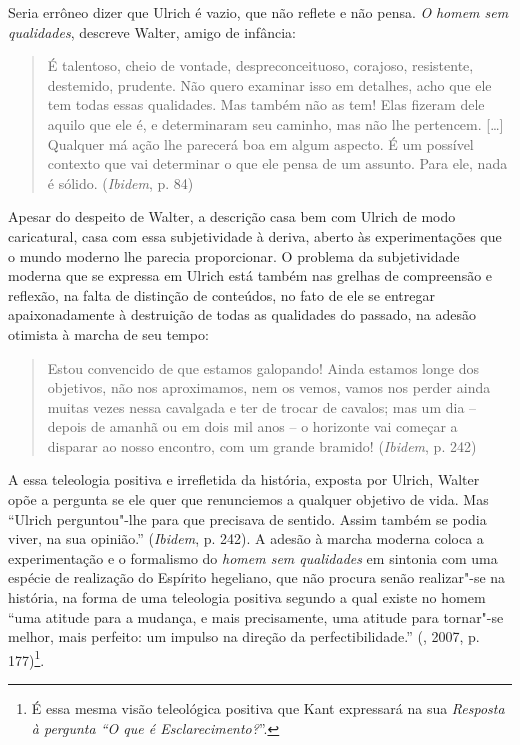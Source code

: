 {Seria errôneo dizer que Ulrich é vazio, que não reflete e não pensa.
\emph{O} \emph{homem sem qualidades}, descreve Walter, amigo de
infância:

\begin{quote}
É talentoso, cheio de vontade, despreconceituoso, corajoso, resistente,
destemido, prudente. Não quero examinar isso em detalhes, acho que ele
tem todas essas qualidades. Mas também não as tem! Elas fizeram dele
aquilo que ele é, e determinaram seu caminho, mas não lhe pertencem.
[\ldots{}] Qualquer má ação lhe parecerá boa em algum aspecto. É um
possível contexto que vai determinar o que ele pensa de um assunto. Para
ele, nada é sólido. (\emph{Ibidem}, p. 84)
\end{quote}

Apesar do despeito de Walter, a descrição casa bem com Ulrich de modo
caricatural, casa com essa subjetividade à deriva, aberto às
experimentações que o mundo moderno lhe parecia proporcionar. O problema
da subjetividade moderna que se expressa em Ulrich está também nas
grelhas de compreensão e reflexão, na falta de distinção de conteúdos,
no fato de ele se entregar apaixonadamente à destruição de todas as
qualidades do passado, na adesão otimista à marcha de seu tempo:

\begin{quote}
Estou convencido de que estamos galopando! Ainda estamos longe dos
objetivos, não nos aproximamos, nem os vemos, vamos nos perder ainda
muitas vezes nessa cavalgada e ter de trocar de cavalos; mas um dia --
depois de amanhã ou em dois mil anos -- o horizonte vai começar a
disparar ao nosso encontro, com um grande bramido! (\emph{Ibidem}, p.
242)
\end{quote}

A essa teleologia positiva e irrefletida da história, exposta por
Ulrich, Walter opõe a pergunta se ele quer que renunciemos a qualquer
objetivo de vida. Mas ``Ulrich perguntou"-lhe para que precisava de
sentido. Assim também se podia viver, na sua opinião.'' (\emph{Ibidem},
p. 242). A adesão à marcha moderna coloca a experimentação e o
formalismo do \emph{homem sem qualidades} em sintonia com uma espécie de
realização do Espírito hegeliano, que não procura senão realizar"-se na
história, na forma de uma teleologia positiva segundo a qual existe no
homem ``uma atitude para a mudança, e mais precisamente, uma atitude
para tornar"-se melhor, mais perfeito: um impulso na direção da
perfectibilidade.'' (, 2007, p. 177)\footnote{É
  essa mesma visão teleológica positiva que Kant expressará na sua
  \emph{Resposta à pergunta ``O que é Esclarecimento?}''.}.

}
